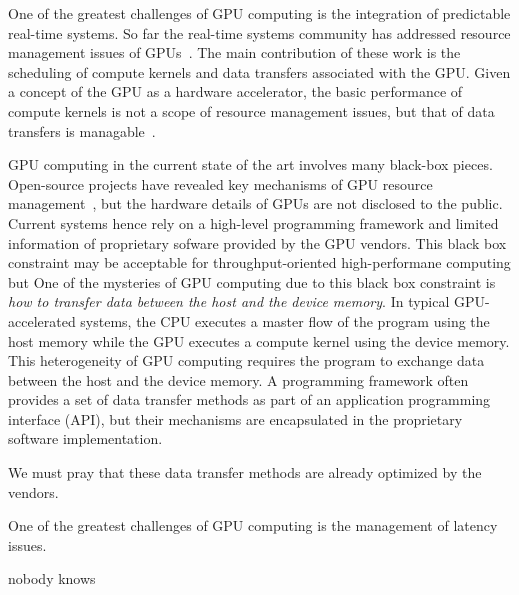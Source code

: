 One of the greatest challenges of GPU computing is the integration of
predictable real-time systems.
So far the real-time systems community has addressed resource management
issues of GPUs~\cite{Basaran_ECRTS12, Elliott_RTS12, Elliott_ECRTS12,
Kato_ATC11, Kato_RTAS11, Kato_RTSS11}.
The main contribution of these work is the scheduling of compute
kernels and data transfers associated with the GPU.
Given a concept of the GPU as a hardware accelerator, the basic
performance of compute kernels is not a scope of resource management
issues, but that of data transfers is managable~\cite{Kato_ATC12}.

GPU computing in the current state of the art involves many black-box
pieces.
Open-source projects have revealed key mechanisms of GPU
resource management~\cite{Kato_ATC11, Kato_ATC12}, but the hardware
details of GPUs are not disclosed to the public.
Current systems hence rely on a high-level programming framework and
limited information of proprietary sofware provided by the GPU
vendors.
This black box constraint may be acceptable for throughput-oriented
high-performane computing but 
One of the mysteries of GPU computing due to this black box constraint
is \textit{how to transfer data between the host and the device memory}.
In typical GPU-accelerated systems, the CPU executes a master flow of
the program using the host memory while the GPU executes a compute
kernel using the device memory.
This heterogeneity of GPU computing requires the program to exchange
data between the host and the device memory.
A programming framework often provides a set of data transfer methods as
part of an application programming interface (API), but their mechanisms
are encapsulated in the proprietary software implementation.

We must pray that these data transfer methods are already optimized by
the vendors.

One of the greatest challenges of GPU computing is the management of
latency issues.

nobody knows